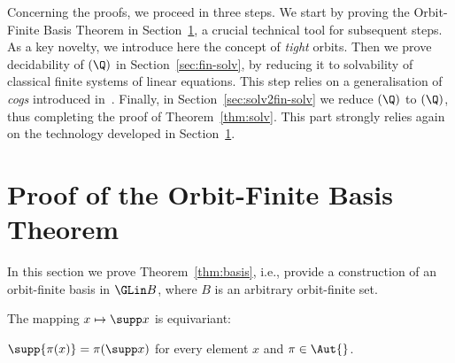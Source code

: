 
Concerning the proofs, we proceed in three steps.
We start by proving the Orbit-Finite Basis Theorem in Section~\ref{sec:bases},
a crucial technical tool for subsequent steps. %
As a key novelty, we introduce here the concept of \emph{tight} orbits.  
Then we prove decidability of \finsolvname$(\Q)$ in Section~\ref{sec:fin-solv}, by reducing it to solvability 
of classical finite systems of linear equations.
This step relies on a generalisation of \emph{cogs} introduced in~\cite{BKM21,HR21}.
Finally, 
in Section~\ref{sec:solv2fin-solv} we reduce \solvname$(\Q)$ to \finsolvname$(\Q)$,
thus completing the proof of Theorem~\ref{thm:solv}.
This part strongly relies again on the technology developed in Section~\ref{sec:bases}.




\section{Proof of the Orbit-Finite Basis Theorem} \label{sec:bases}

In this section we prove Theorem~\ref{thm:basis},
i.e., provide a construction of an orbit-finite basis in $\GLin B$, where $B$ is an arbitrary orbit-finite set.


The mapping $x\mapsto \supp x$ is equivariant:
%
\begin{claim} \label{claim:pisup}
$\supp{\pi(x)} = \pi(\supp x)$ for every element $x$ and $\pi\in\Aut{}$.
\end{claim}
%

